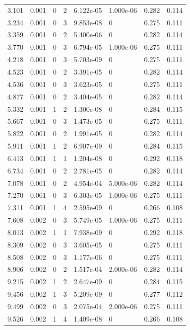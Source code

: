 \documentclass[preview]{standalone}
\begin{document}
{{\begin{tabular}{L{1.2cm}C{1.2cm} C{0.3cm}C{0.5cm} C{1.4cm}C{1.4cm} C{1.4cm}C{1.4cm}}
  3.101  &  0.001  & 0     &  2 &  6.122e-05  & 1.000e-06  & 0.282 &  0.114   \\ 
  3.234  &  0.001  & 0     &  3 &  9.853e-08  & 0  & 0.275 &  0.111   \\ 
  3.359  &  0.001  & 0     &  2 &  5.400e-06  & 0  & 0.282 &  0.114   \\ 
  3.770  &  0.001  & 0     &  3 &  6.794e-05  & 1.000e-06  & 0.275 &  0.111   \\ 
  4.218  &  0.001  & 0     &  3 &  5.703e-09  & 0  & 0.275 &  0.111   \\ 
  4.523  &  0.001  & 0     &  2 &  3.391e-05  & 0  & 0.282 &  0.114   \\ 
  4.536  &  0.001  & 0     &  3 &  3.623e-05  & 0  & 0.275 &  0.111   \\ 
  4.877  &  0.001  & 0     &  2 &  3.404e-05  & 0  & 0.282 &  0.114   \\ 
  5.332  &  0.001  & 1     &  2 &  1.300e-08  & 0  & 0.284 &  0.115   \\ 
  5.667  &  0.001  & 0     &  3 &  1.473e-05  & 0  & 0.275 &  0.111   \\ 
  5.822  &  0.001  & 0     &  2 &  1.991e-05  & 0  & 0.282 &  0.114   \\ 
  5.911  &  0.001  & 1     &  2 &  6.907e-09  & 0  & 0.284 &  0.115   \\ 
  6.413  &  0.001  & 1     &  1 &  1.204e-08  & 0  & 0.292 &  0.118   \\ 
  6.734  &  0.001  & 0     &  2 &  2.781e-05  & 0  & 0.282 &  0.114   \\ 
  7.078  &  0.001  & 0     &  2 &  4.954e-04  & 5.000e-06  & 0.282 &  0.114   \\ 
  7.270  &  0.001  & 0     &  3 &  6.303e-05  & 1.000e-06  & 0.275 &  0.111   \\ 
  7.311  &  0.001  & 1     &  4 &  2.595e-09  & 0  & 0.266 &  0.108   \\ 
  7.608  &  0.002  & 0     &  3 &  5.749e-05  & 1.000e-06  & 0.275 &  0.111   \\ 
  8.013  &  0.002  & 1     &  1 &  7.938e-09  & 0  & 0.292 &  0.118   \\ 
  8.309  &  0.002  & 0     &  3 &  3.605e-05  & 0  & 0.275 &  0.111   \\ 
  8.508  &  0.002  & 0     &  3 &  1.177e-06  & 0  & 0.275 &  0.111   \\ 
  8.906  &  0.002  & 0     &  2 &  1.517e-04  & 2.000e-06  & 0.282 &  0.114   \\ 
  9.215  &  0.002  & 1     &  2 &  2.647e-09  & 0  & 0.284 &  0.115   \\ 
  9.456  &  0.002  & 1     &  3 &  5.209e-09  & 0  & 0.277 &  0.112   \\ 
  9.499  &  0.002  & 0     &  3 &  2.075e-04  & 2.000e-06  & 0.275 &  0.111   \\ 
  9.526  &  0.002  & 1     &  4 &  1.409e-08  & 0  & 0.266 &  0.108   \\ 
\hline 
\end{tabular} 

}}
\end{document}
